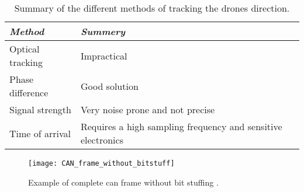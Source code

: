
\begin{table}[h]
	\centering
	\caption{Summary of the different methods of tracking the drones direction.}\label{tab:trackdirectconcl}
	\begin{tabular}{ll}
		\textit{Method} 				& \textit{Summery}  	\\ \toprule \rowcolor{lightGrey}
		Optical tracking				& Impractical \\
		Phase difference 				& Good solution \\ \rowcolor{lightGrey}
		Signal strength 				& Very noise prone and not precise \\
		Time of arrival					& Requires a high sampling frequency and sensitive electronics \\
	\end{tabular}
\end{table}



\begin{figure} [h]
	\centering
	\texttt{[image: CAN\_frame\_without\_bitstuff]}
	\caption{Example of complete \gls{can} frame without bit stuffing \citep{CAN-Bus-frame}.}
	\label{fig:frame_wo_bitstuff}
\end{figure}